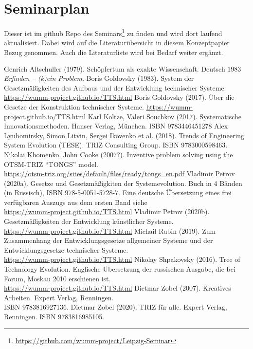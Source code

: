 \documentclass[11pt,a4paper]{article}
\begin{document}
\section{Seminarplan}

Dieser ist im github Repo des
Seminars\footnote{\url{https://github.com/wumm-project/Leipzig-Seminar}} zu
finden und wird dort laufend aktualisiert.  Dabei wird auf die
Literaturübersicht in diesem Konzeptpapier Bezug genommen. Auch die
Literaturliste wird bei Bedarf weiter ergänzt.

\begin{thebibliography}{xxx}
 Genrich Altschuller (1979).  Schöpfertum als exakte
  Wissenschaft.  Deutsch 1983 \emph{Erfinden -- (k)ein Problem}.
 Boris Goldovsky (1983). System der Gesetzmäßigkeiten
  des Aufbaus und der Entwicklung technischer Systeme.
  \url{https://wumm-project.github.io/TTS.html}
 Boris Goldovsky (2017). Über die Gesetze der
  Konstruktion technischer Systeme.  
  \url{https://wumm-project.github.io/TTS.html}
 Karl Koltze, Valeri Souchkov (2017).
  Systematische Innovationsmethoden.  Hanser Verlag, München. ISBN
  9783446451278
 Alex Lyubomirsky, Simon Litvin, Sergei Ikovenko et al.
  (2018). Trends of Engineering System Evolution (TESE).  TRIZ Consulting
  Group. ISBN 9783000598463.
 Nikolai Khomenko, John Cooke (2007?).  Inventive
  problem solving using the OTSM-TRIZ “TONGS” model. \\
  \url{https://otsm-triz.org/sites/default/files/ready/tongs_en.pdf}
 Vladimir Petrov (2020a). Gesetze und Gesetzmäßigkiten
  der Systemevolution. Buch in 4 Bänden (in Russisch), ISBN
  978-5-0051-5728-7.  Eine deutsche Übersetzung eines frei verfügbaren Auszugs
  aus dem ersten Band siehe \\
  \url{https://wumm-project.github.io/TTS.html}
 Vladimir Petrov (2020b). Gesetzmäßigkeiten der
  Entwicklung künstlicher Systeme. \\
  \url{https://wumm-project.github.io/TTS.html} 
 Michail Rubin (2019). Zum Zusammenhang der
  Entwicklungsgesetze allgemeiner Systeme und der Entwicklungsgesetze
  technischer Systeme. \\ \url{https://wumm-project.github.io/TTS.html}
 Nikolay Shpakovsky (2016). Tree of Technology
  Evolution. Englische Übersetzung der russischen Ausgabe, die bei Forum,
  Moskau 2010 erschienen ist.\\ \url{https://wumm-project.github.io/TTS.html}
 Dietmar Zobel (2007). Kreatives Arbeiten. Expert Verlag,
  Renningen.\\ ISBN 9783816927136.
 Dietmar Zobel (2020). TRIZ für alle. Expert Verlag,
  Renningen. ISBN 9783816985105.
\end{thebibliography}
\end{document}
